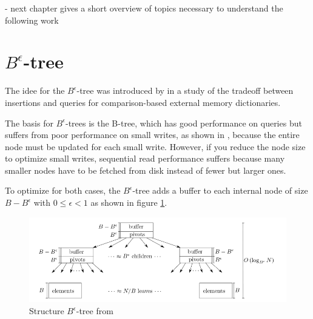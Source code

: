 \documentclass[
	12pt,
	a4paper,
	abstract,
	bibliography=totoc,
	chapterprefix,
	headings=openright,
	numbers=endperiod,
	parskip=half,
	twoside,
]{scrreprt}
\begin{document}
- next chapter gives a short overview of topics necessary to understand the following work\\

\section{$B^{\epsilon}$-tree}


The idee for the $B^{\epsilon}$-tree was introduced by \cite{brodal2003lower} in a study of the tradeoff between insertions and queries for comparison-based external memory dictionaries.

The basis for $B^{\epsilon}$-trees is the B-tree, which has good performance on queries but suffers from poor performance on small writes, as shown in \cite{bender2015introduction}, 
because the entire node must be updated for each small write.
However, if you reduce the node size to optimize small writes, sequential read performance suffers because many smaller nodes have to be fetched from disk instead of fewer but larger ones.

To optimize for both cases, the $B^{\epsilon}$-tree adds a buffer to each internal node of size $B - B^{\epsilon} $ with $ 0 \leq \epsilon < 1$ as shown in figure \ref{fig:structure B-epsilon-tree}.

\begin{figure}[ht]
	\centering
	\includegraphics[scale=0.6]{B-epsilon_structure.png}
	\caption{Structure $B^{\epsilon}$-tree from \cite{bender2015introduction}}
		\label{fig:structure B-epsilon-tree}
\end{figure}
\end{document}
